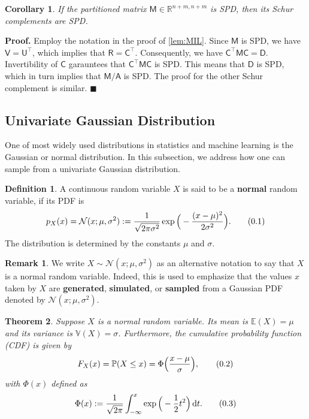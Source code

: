\documentclass[10pt]{article}
\newtheorem{thm}{Theorem}[section]
\newtheorem{cor}[thm]{Corollary}
\theoremstyle{definition}
\newtheorem{defn}{Definition}[section]
\newtheorem*{rem}{Remark}
\newenvironment{prf}{\noindent\textbf{Proof.}}{\hfill$\blacksquare$}
\newcommand\eqnum{\addtocounter{equation}{1}\tag{\arabic{section}.\arabic{equation}}}
\DeclareMathOperator{\df}{d\!}
\begin{document}
\begin{cor}\label{cor:MIL:SPD}
If the partitioned matrix $\mathsf{M}\in\mathbb{R}^{n+m,n+m}$ is SPD, then its Schur complements are SPD.
\end{cor}
\begin{prf}
Employ the notation in the proof of \cref{lem:MIL}. Since $\mathsf{M}$ is SPD, we have $\mathsf{V}=\mathsf{U}^{\top}$, which implies that $\mathsf{R}=\mathsf{C}^{\top}$. Consequently, we have $\mathsf{C}^{\top}\mathsf{M}\mathsf{C}=\mathsf{D}$. Invertibility of $\mathsf{C}$ garauntees that $\mathsf{C}^{\top}\mathsf{M}\mathsf{C}$ is SPD. This means that $\mathsf{D}$ is SPD, which in turn implies that $\mathsf{M}/\mathsf{A}$ is SPD. The proof for the other Schur complement is similar.
\end{prf}
\subsection{Univariate Gaussian Distribution}
One of most widely used distributions in statistics and machine learning is the Gaussian or normal distribution. In this subsection, we address how one can sample from a univariate Gaussian distribution.
\begin{defn}
A continuous random variable $X$ is said to be a \textbf{normal} random variable, if its PDF is
\begin{equation*}
p_{X}(x) = \mathcal{N}(x; \mu, \sigma^2) := \frac{1}{\sqrt{2\pi\sigma^2}}\exp\Big(-\frac{(x-\mu)^2}{2\sigma^2}\Big).
\eqnum
\end{equation*}
The distribution is determined by the constants $\mu$ and $\sigma$. 
\end{defn}
\begin{rem}
We write $X\sim \mathcal{N}(x; \mu, \sigma^2)$ as an alternative notation to say that $X$ is a normal random variable. Indeed, this is used to emphasize that the values $x$ taken by $X$ are \textbf{generated}, \textbf{simulated}, or \textbf{sampled} from a Gaussian PDF denoted by $\mathcal{N}(x; \mu, \sigma^2)$. 
\end{rem}
\begin{thm}
Suppose $X$ is a normal random variable. Its mean is $\mathbb{E}(X) = \mu$ and its variance is $\mathbb{V}(X)=\sigma$. Furthermore, the cumulative probability function (CDF) is given by
\begin{equation*}
F_{X}(x) = \mathbb{P}(X \leq x) = \Phi\Big(\frac{x-\mu}{\sigma}\Big),
\eqnum
\end{equation*}
with $\Phi(x)$ defined as
\begin{equation*}
\Phi(x) := \frac{1}{\sqrt{2\pi}}\int_{-\infty}^{x}\exp\Big(-\frac{1}{2}t^2\Big)\df t.
\eqnum
\end{equation*}
\end{thm}
\end{document}
